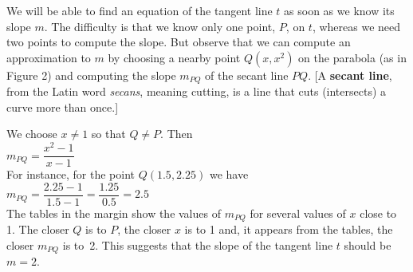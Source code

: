 \documentclass{sebase}
\begin{document}
\begin{Solution}
We will be able to find an equation of the tangent line $t$ as soon as we
know its slope $m$. The difficulty is that we know only one point, $P$, on $%
t $, whereas we need two points to compute the slope. But observe that we
can compute an approximation to $m$ by choosing a nearby point $Q(x,x^{2})$
on the parabola (as in Figure 2) 
and computing the slope $m_{PQ}$ of the secant
line $PQ$. [A \textbf{secant line}, from the Latin word \textit{secans},
meaning cutting, is a line that cuts (intersects) a curve more than once.]

We choose $x\neq 1$ so that $Q\neq P$. Then\\[6pt]
\hspace*{\fill}$m_{PQ}=\dfrac{x^{2}-1}{x-1}$\hspace*{\fill}\\[6pt]
For instance, for the point $Q(1.5,2.25)$ we have\\[6pt]
\hspace*{\fill}$m_{PQ}=\dfrac{2.25-1}{1.5-1}=\dfrac{1.25}{0.5}=2.5$\hspace*{%
\fill}\\[6pt]
The tables in the margin show the values of $m_{PQ}$ for
several values of $x$ close to 1. The closer $Q$ is to $P$, the closer $x$
is to 1 and, it appears from the tables, the closer $m_{PQ}$ is to~2. This
suggests that the slope of the tangent line $t$ should be $m=2$.


\end{Solution}
\end{document}
